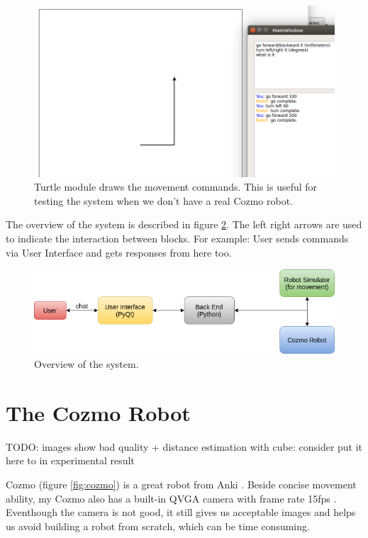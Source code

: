 \begin{figure}[!htb]
	\centering
	\includegraphics[width=0.8\hsize]{./figures/simulator}
	\caption{Turtle module draws the movement commands. This is useful for testing the system when we don't have a real Cozmo robot.}
	\label{fig:simulator}
\end{figure}

The overview of the system is described in figure \ref{fig:UIdesign}. The left right arrows are used to indicate the interaction between blocks. For example: User sends commands via User Interface and gets responses from here too.

\begin{figure}[!htb]
	\centering
	\includegraphics[width=1.0\hsize]{./figures/UIdesign}
	\caption{Overview of the system.}
	\label{fig:UIdesign}
\end{figure}

\section{The Cozmo Robot}
\label{sec:Cozmo}

TODO: images show bad quality + distance estimation with cube: consider put it here to in experimental result

Cozmo (figure \ref{fig:cozmo}) is a great robot from Anki \cite{AnkiOfficial:2017}. Beside concise movement ability, my Cozmo also has a built-in QVGA camera with frame rate 15fps \cite{cozmoTech}. Eventhough the camera is not good, it still gives us acceptable images and helps us avoid building a robot from scratch, which can be time consuming.

